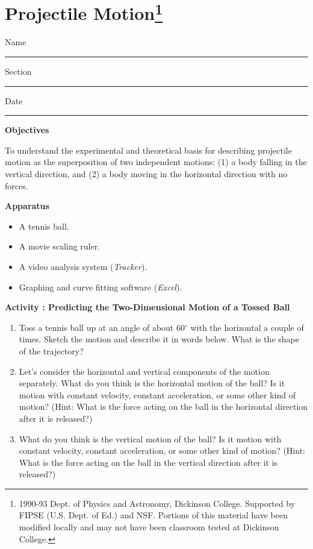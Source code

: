 
\section{Projectile Motion\footnote{
1990-93 Dept. of Physics and Astronomy, Dickinson College. Supported by FIPSE
(U.S. Dept. of Ed.) and NSF. Portions of this material have been modified locally
and may not have been classroom tested at Dickinson College.
}}

Name \rule{2.0in}{0.1pt}\hfill{}Section \rule{1.0in}{0.1pt}\hfill{}Date \rule{1.0in}{0.1pt}

\textbf{Objectives }

To understand the experimental and theoretical basis for describing projectile
motion as the superposition of two independent motions: (1) a body falling in
the vertical direction, and (2) a body moving in the horizontal direction with
no forces.

\textbf{Apparatus}

\begin{itemize}
\item A tennis ball. 
\item A movie scaling ruler.
\item A video analysis system (\textit{Tracker}). 
\item Graphing and curve fitting software (\textit{Excel}).
\end{itemize}
\textbf{Activity : Predicting the Two-Dimensional Motion of a Tossed Ball }

\begin{enumerate}

\item Toss a tennis ball up at an angle of about 60\( ^{\circ } \) with the horizontal
a couple of times. Sketch the motion and describe it in words below. What is
the shape of the trajectory?
\vspace{20mm}

\item Let's consider the horizontal and vertical components of the motion separately.
What do you think is the horizontal motion of the ball? Is it motion with constant
velocity, constant acceleration, or some other kind of motion? (Hint: What
is the force acting on the ball in the horizontal direction after it is released?)
\vspace{20mm}

\item What do you think is the vertical motion of the ball? Is it motion with
constant velocity, constant acceleration, or some other kind of motion?
(Hint: What is the force acting on the ball in the vertical direction after
it is released?)
\vspace{20mm}

\end{enumerate}

